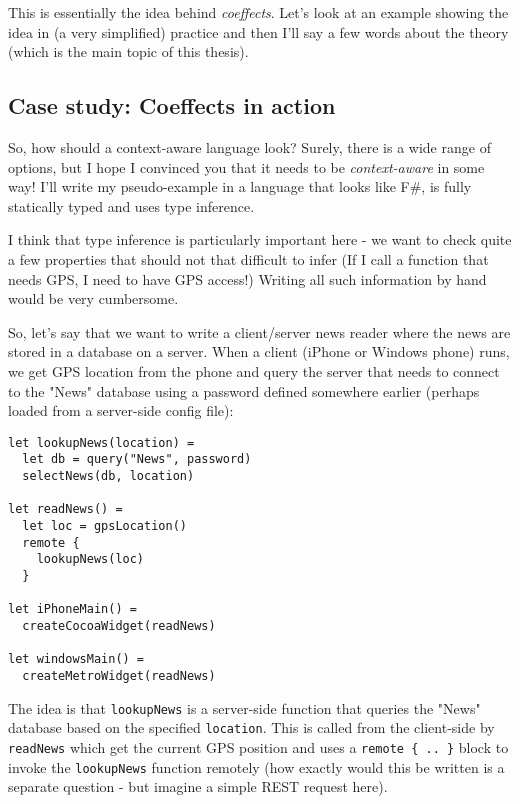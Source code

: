 This is essentially the idea behind \emph{coeffects}. Let's look at an example showing the
idea in (a very simplified) practice and then I'll say a few words about the theory
(which is the main topic of this thesis).


\subsection{Case study: Coeffects in action}

So, how should a context-aware language look? Surely, there is a wide range of options, but I hope
I convinced you that it needs to be \emph{context-aware} in some way! I'll write my pseudo-example in a
language that looks like F\#, is fully statically typed and uses type inference.

I think that type inference is particularly important here - we want to check quite a few properties
that should not that difficult to infer (If I call a function that needs GPS, I need to have GPS access!)
Writing all such information by hand would be very cumbersome.

So, let's say that we want to write a client/server news reader where the news are stored in a 
database on a server. When a client (iPhone or Windows phone) runs, we get GPS location from the
phone and query the server that needs to connect to the "News" database using a password defined
somewhere earlier (perhaps loaded from a server-side config file):

\begin{verbatim}
let lookupNews(location) =
  let db = query("News", password)
  selectNews(db, location)  

let readNews() =
  let loc = gpsLocation()       
  remote { 
    lookupNews(loc) 
  } 

let iPhoneMain() =
  createCocoaWidget(readNews)

let windowsMain() =    
  createMetroWidget(readNews)
\end{verbatim}

The idea is that \texttt{lookupNews} is a server-side function that queries the "News" database based on 
the specified \texttt{location}. This is called from the client-side by \texttt{readNews} which get the current GPS
position and uses a \texttt{remote \{ .. \}} block to invoke the \texttt{lookupNews} function remotely (how exactly would
this be written is a separate question - but imagine a simple REST request here).

